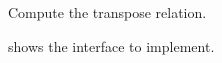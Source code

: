

\begin{codeexercise}
    Compute the transpose relation.

     shows the interface to implement.
\end{codeexercise}

